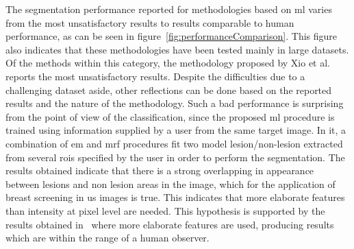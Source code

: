 \documentclass[authoryear,preprint,review,12pt]{elsarticle}
\begin{document}



The segmentation performance reported for methodologies based on \ac{ml} varies from the most unsatisfactory results to results comparable to human performance, as can be seen in figure~\ref{fig:performanceComparison}. This figure also indicates that these methodologies have been tested mainly in large datasets. Of the methods within this category, the methodology proposed by Xio et al.~\cite{Xiao:2002p5639} reports the most unsatisfactory results. Despite the difficulties due to a challenging dataset aside, other reflections can be done based on the reported results and the nature of the methodology. Such a bad performance is surprising from the point of view of the classification, since the proposed \ac{ml} procedure is trained using information supplied by a user from the same target image. In it, a combination of \ac{em} and \ac{mrf} procedures fit two model lesion/non-lesion extracted from several \acp{roi} specified by the user in order to perform the segmentation. The results obtained indicate that there is a strong overlapping in appearance between lesions and non lesion areas in the image, which for the application of breast screening in \ac{us} images is true. This indicates that more elaborate features than intensity at pixel level are needed. This hypothesis is supported by the results obtained in~\cite{Zhang:2010p14317,Shan:2012p14347} where more elaborate features are used, producing results which are within the range of a human observer. 
\end{document}
